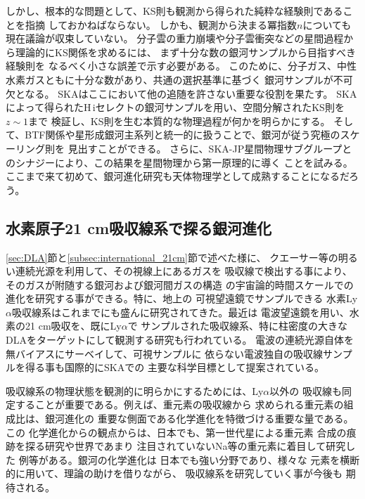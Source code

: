 しかし、根本的な問題として、KS則も観測から得られた純粋な経験則であることを指摘
しておかねばならない。
しかも、観測から決まる冪指数$n$についても現在議論が収束していない。
分子雲の重力崩壊や分子雲衝突などの星間過程から理論的にKS関係を求めるには、
まず十分な数の銀河サンプルから目指すべき経験則を
なるべく小さな誤差で示す必要がある。
このために、分子ガス、中性水素ガスともに十分な数があり、共通の選択基準に基づく
銀河サンプルが不可欠となる。
SKAはここにおいて他の追随を許さない重要な役割を果たす。
SKAによって得られたH\,{\sc i}セレクトの銀河サンプルを用い、空間分解されたKS則を$z \sim 1$まで
検証し、KS則を生む本質的な物理過程が何かを明らかにする。
そして、BTF関係や星形成銀河主系列と統一的に扱うことで、銀河が従う究極のスケーリング則を
見出すことができる。 
さらに、SKA-JP星間物理サブグループとのシナジーにより、この結果を星間物理から第一原理的に導く
ことを試みる。
ここまで来て初めて、銀河進化研究も天体物理学として成熟することになるだろう。



\subsection{水素原子21 cm吸収線系で探る銀河進化}\label{galaxy.s3.ss1}

\ref{sec:DLA}節と\ref{subsec:international_21cm}節で述べた様に、
クエーサー等の明るい連続光源を利用して、その視線上にあるガスを
吸収線で検出する事により、そのガスが附随する銀河および銀河間ガスの構造
の宇宙論的時間スケールでの進化を研究する事ができる。特に、地上の
可視望遠鏡でサンプルできる
水素Ly$\alpha$吸収線系はこれまでにも盛んに研究されてきた。最近は
電波望遠鏡を用い、水素の21 cm吸収を、既にLy$\alpha$で
サンプルされた吸収線系、特に柱密度の大きな%
DLAをターゲットにして観測する研究も行われている。
電波の連続光源自体を無バイアスにサーベイして、可視サンプルに
依らない電波独自の吸収線サンプルを得る事も国際的にSKAでの
主要な科学目標として提案されている。

吸収線系の物理状態を観測的に明らかにするためには、Ly$\alpha$以外の
吸収線も同定することが重要である。例えば、重元素の吸収線から
求められる重元素の組成比は、銀河進化の
重要な側面である化学進化を特徴づける重要な量である。この
化学進化からの観点からは、日本でも、第一世代星による重元素
合成の痕跡を探る研究\citep{2011ApJ...730L..14K}や世界であまり
注目されていないNa等の重元素に着目して研究した
例\citep{2006ApJ...643..667K}等がある。銀河の化学進化は
日本でも強い分野であり、様々な
元素を横断的に用いて、理論の助けを借りながら、
吸収線系を研究していく事が今後も
期待される。


